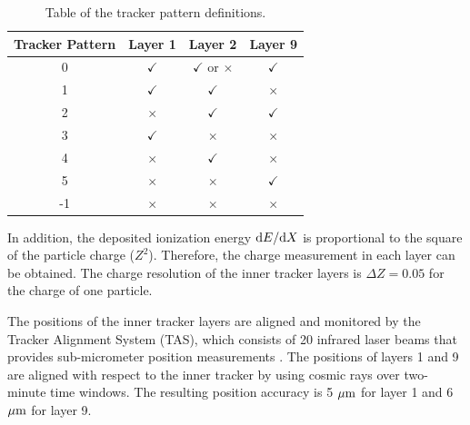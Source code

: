 \begin{table}[h]
\center
\caption{Table of the tracker pattern definitions.}
\label{TackerPatterns}
\begin{tabular}{cccc} 
\hline
Tracker Pattern & Layer 1 & Layer 2 & Layer 9 \\
\hline
0  &  $\checkmark$   & $\checkmark$ or $\times$  & $\checkmark$   \\      %
1  &  $\checkmark$   & $\checkmark$                     & $\times$            \\      %
2  &  $\times$            & $\checkmark$                     & $\checkmark$   \\      %
3  &  $\checkmark$   & $\times$                              &  $\times$           \\       %
4  &  $\times$            &  $\checkmark$                     &  $\times$           \\       %
5  &  $\times$           &  $\times$                              &    $\checkmark$  \\       %
-1 & $\times$            & $\times$                               & $\times$              \\       %
\hline
\end{tabular}
\end{table}


In addition, the deposited ionization energy ${\rm{d}}E/{\rm{d}}X$ is proportional to the square of the particle charge ($Z^2$). Therefore, the charge measurement in each layer can be obtained. The charge resolution of the inner tracker layers is $\Delta Z = 0.05$ for the charge of one particle.  \par



The positions of the inner tracker layers are aligned and monitored by the Tracker Alignment System (TAS), which consists of 20 infrared laser beams that provides sub-micrometer position measurements \cite{AMSTrackerAlignment1, AMSTrackerAlignment2}. The positions of layers 1 and 9 are aligned with respect to the inner tracker by using cosmic rays over two-minute time windows. The resulting position accuracy is 5 $\rm{\mu m}$ for layer 1 and 6 $\rm{\mu m}$ for layer 9. \par 


